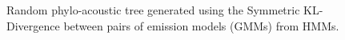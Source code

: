 \documentclass[pdftex,11pt,a4paper]{article}
\theoremstyle{definition}
\theoremstyle{remark}
\begin{document}
\begin{figure}
\noindent{}
    \caption{Random phylo-acoustic tree generated using the Symmetric KL-Divergence between pairs of emission models (GMMs) from HMMs.}
    \label{fig:rgmmskld}
\end{figure}
\end{document}
